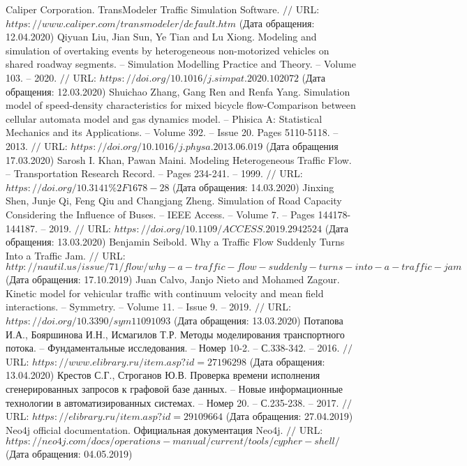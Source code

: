 \begin{thebibliography}{00}
	Caliper Corporation. TransModeler Traffic Simulation Software. $//$ URL: $https://www.caliper.com/transmodeler/default.htm$ (Дата обращения: 12.04.2020)
	Qiyuan Liu, Jian Sun, Ye Tian and Lu Xiong. Modeling and simulation of overtaking events by heterogeneous non-motorized vehicles on shared roadway segments. -- Simulation Modelling Practice and Theory. -- Volume 103. -- 2020. $//$ URL: $https://doi.org/10.1016/j.simpat.2020.102072$ (Дата обращения: 12.03.2020)
	Shuichao Zhang, Gang Ren and Renfa Yang. Simulation model of speed-density characteristics for mixed bicycle flow-Comparison between cellular automata model and gas dynamics model. -- Phisica A: Statistical Mechanics and its Applications. -- Volume 392. -- Issue 20. Pages 5110-5118. -- 2013. $//$ URL: $https://doi.org/10.1016/j.physa.2013.06.019$ (Дата обращения 17.03.2020)
	Sarosh I. Khan, Pawan Maini. Modeling Heterogeneous Traffic Flow. -- Transportation Research Record. -- Pages 234-241. -- 1999. $//$ URL: $https://doi.org/10.3141\%2F1678-28$ (Дата обращения: 14.03.2020)
	Jinxing Shen, Junje Qi, Feng Qiu and Changjang Zheng. Simulation of Road Capacity Considering the Influence of Buses. -- IEEE Access. -- Volume 7. -- Pages 144178-144187. -- 2019. $//$ URL: $https://doi.org/10.1109/ACCESS.2019.2942524$ (Дата обращения: 13.03.2020)
	Benjamin Seibold. Why a Traffic Flow Suddenly Turns Into a Traffic Jam. $//$ URL: $http://nautil.us/issue/71/flow/why-a-traffic-flow-suddenly-turns-into-a-traffic-jam$ (Дата обращения: 17.10.2019)
	Juan Calvo, Janjo Nieto and Mohamed Zagour. Kinetic model for vehicular traffic with continuum velocity and mean field interactions. -- Symmetry. -- Volume 11. -- Issue 9. -- 2019. $//$ URL: $https://doi.org/10.3390/sym11091093$ (Дата обращения: 13.03.2020)
	Потапова И.А., Бояршинова И.Н., Исмагилов Т.Р. Методы моделирования транспортного потока. --  Фундаментальные исследования. -- Номер 10-2. -- С.338-342. -- 2016. $//$ URL: $https://www.elibrary.ru/item.asp?id=27196298$ (Дата обращения: 13.04.2020)
	Крестов С.Г., Строганов Ю.В. Проверка времени исполнения сгенерированных запросов к графовой базе данных. – Новые информационные технологии в автоматизированных системах. -- Номер 20. -- С.235-238. -- 2017. $//$ URL: $https://elibrary.ru/item.asp?id=29109664$ (Дата обращения: 27.04.2019)
	Neo4j official documentation. Официальная документация Neo4j. $//$ URL: $https://neo4j.com/docs/operations-manual/current/tools/cypher-shell/$ (Дата обращения: 04.05.2019)

\end{thebibliography}
